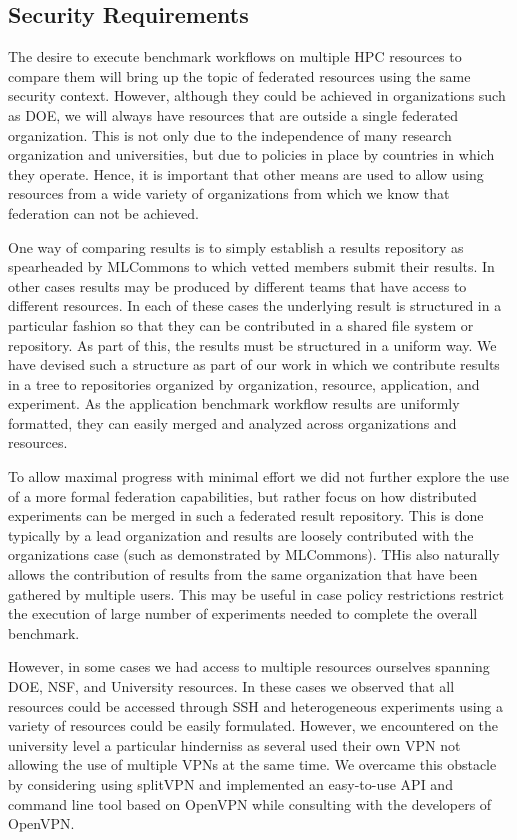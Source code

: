 \documentclass[utf8]{FrontiersinVancouver} %
\begin{document}
\subsection{Security Requirements}

The desire to execute benchmark workflows on multiple HPC resources to compare them will bring up the topic of federated resources using the same security context. However, although they could be achieved in organizations such as DOE, we will always have resources that are outside a single federated organization. This is not only due to the independence of many research organization and universities, but due to policies in place by countries in which they operate. Hence, it is important that other means are used to allow using resources from a wide variety of organizations from which we know that federation can not be achieved.

One way of comparing results is to simply establish a results repository as spearheaded by MLCommons to which vetted members submit their results. In other cases results may be produced by different teams that have access to different resources. In each of these cases the underlying result is structured in a particular fashion so that they can be contributed in a shared file system or repository. As part of this, the results must be structured in a uniform way. We have devised such a structure as part of our work in which we contribute results in a tree to repositories organized by organization, resource, application, and experiment. As the application benchmark workflow results are uniformly formatted, they can easily merged and analyzed across organizations and resources. 

To allow maximal progress with minimal effort we did not further explore the use of a more formal federation capabilities, but rather focus on how distributed experiments can be merged in such a federated result repository. This is done typically by a lead organization and results are loosely contributed with the organizations case (such as demonstrated by MLCommons). THis also naturally allows the contribution of results from the same organization that have been gathered by multiple users. This may be useful in case policy restrictions restrict the execution of large number of experiments needed to complete the overall benchmark.

However, in some cases we had access to multiple resources ourselves spanning DOE, NSF, and University resources. In these cases we observed that all resources could be accessed through SSH and heterogeneous experiments using a variety of resources could be easily formulated. However, we encountered on the university level a particular hinderniss as several used their own VPN not allowing the use of multiple VPNs at the same time. We overcame this obstacle by considering using splitVPN and implemented an easy-to-use API and command line tool based on OpenVPN while consulting with the developers of OpenVPN. 
\end{document}

